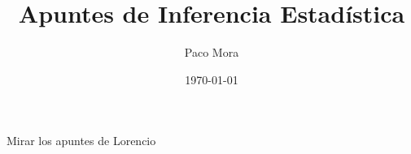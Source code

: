 \documentclass[openany]{book}
\title{Apuntes de Inferencia Estadística}
\author{Paco Mora}
\date{\today}
\begin{document}
Mirar los apuntes de Lorencio














\end{document}
